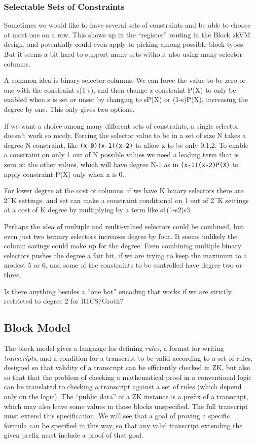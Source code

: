 \documentclass{article}
\theoremstyle{plain}
\theoremstyle{definition}
\begin{document}
\subsubsection{Selectable Sets of Constraints}\label{selectable-sets-of-constraints}

Sometimes we would like to have several sets of constraints and be able
to choose at most one on a row. This shows up in the ``register''
routing in the Block zkVM design, and potentially could even apply to
picking among possible block types. But it seems a bit hard to support
many sets without also using many selector columns.

A common idea is binary selector columns. We can force the value to be
zero or one with the constraint s(1-s), and then change a constraint
P(X) to only be enabled when s is set or unset by changing to sP(X) or
(1-s)P(X), increasing the degree by one. This only gives two options.

If we want a choice among many different sets of constraints, a single
selector doesn't work so nicely. Forcing the selector value to be in a
set of size N takes a degree N constraint, like \texttt{(x-0)(x-1)(x-2)}
to allow x to be only 0,1,2. To enable a constraint on only 1 out of N
possible values we need a leading term that is zero on the other values,
which will have degree N-1 as in \texttt{(x-1)(x-2)P(X)} to apply
constraint P(X) only when x is 0.

For lower degree at the cost of columns, if we have K binary selectors
there are 2\^{}K settings, and set can make a constraint conditional on
1 out of 2\^{}K settings at a cost of K degree by multiplying by a term
like s1(1-s2)s3.

Perhaps the idea of multiple and multi-valued selectors could be
combined, but even just two ternary selectors increases degree by four.
It seems unlikely the column savings could make up for the degree. Even
combining multiple binary selectors pushes the degree a fair bit, if we
are trying to keep the maximum to a modest 5 or 6, and some of the
constraints to be controlled have degree two or three.

Is there anything besides a ``one hot'' encoding that works if we are
strictly restricted to degree 2 for R1CS/Groth?
\subsection{Block Model}\label{block-model}
The block model gives a language for defining \emph{rules}, a format
for writing \emph{transcripts}, and a condition for a transcript to
be valid according to a set of rules, designed so that validity of
a transcript can be efficiently checked in ZK, but also so that
that the problem of checking a mathematical proof in a conventional
logic can be translated to checking a transcript against a set of
rules (which depend only on the logic).
The ``public data'' of a ZK instance is a prefix of a transcript,
which may also leave some values in those blocks unspecified.
The full transcript must extend this specification.
We will see that a goal of proving a specific formula can be
specified in this way, so that any valid transcript extending
the given prefix must include a proof of that goal.
\end{document}
